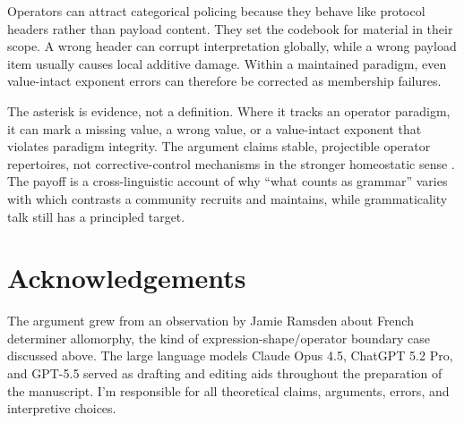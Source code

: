 \documentclass[12pt,letterpaper]{article}
\begin{document}
Operators can attract categorical policing because they behave like protocol headers rather than payload content. They set the codebook for material in their scope. A wrong header can corrupt interpretation globally, while a wrong payload item usually causes local additive damage. Within a maintained paradigm, even value-intact exponent errors can therefore be corrected as membership failures.

The asterisk is evidence, not a definition. Where it tracks an operator paradigm, it can mark a missing value, a wrong value, or a value-intact exponent that violates paradigm integrity. The argument claims stable, projectible operator repertoires, not corrective-control mechanisms in the stronger homeostatic sense \citep{weinberger2026HomeostasisCausalControl,reynolds2026notEveryStableCluster}. The payoff is a cross-linguistic account of why \enquote{what counts as grammar} varies with which contrasts a community recruits and maintains, while grammaticality talk still has a principled target.


\section*{Acknowledgements}

The argument grew from an observation by Jamie Ramsden about French determiner allomorphy, the kind of expression-shape/operator boundary case discussed above. The large language models Claude Opus 4.5, ChatGPT 5.2 Pro, and GPT-5.5 served as drafting and editing aids throughout the preparation of the manuscript. I'm responsible for all theoretical claims, arguments, errors, and interpretive choices.

\clearpage
\printbibliography
\end{document}
